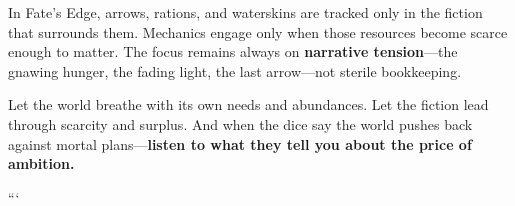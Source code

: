 In Fate's Edge, arrows, rations, and waterskins are tracked only in the fiction that surrounds them. Mechanics engage only when those resources become scarce enough to matter. The focus remains always on \textbf{narrative tension}—the gnawing hunger, the fading light, the last arrow—not sterile bookkeeping.

Let the world breathe with its own needs and abundances. Let the fiction lead through scarcity and surplus. And when the dice say the world pushes back against mortal plans—\textbf{listen to what they tell you about the price of ambition.}


```